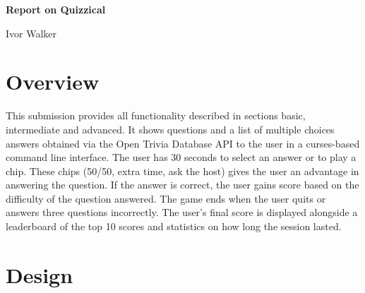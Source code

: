 \documentclass[12pt]{article}
\begin{document}
\begin{titlepage}
    \centering
    \vspace*{\fill}

    {\Huge \textbf{Report on Quizzical} \par}    
    \vspace{1cm}
    {\Large Ivor Walker\par}      
    \vspace{1cm}
    
    \vspace*{\fill}
\end{titlepage}


\section{Overview}

This submission provides all functionality described in sections basic, intermediate and advanced. It shows questions and a list of multiple choices answers obtained via the Open Trivia Database API to the user in a curses-based command line interface. The user has 30 seconds to select an answer or to play a chip. These chips (50/50, extra time, ask the host) gives the user an advantage in answering the question. If the answer is correct, the user gains score based on the difficulty of the question answered. The game ends when the user quits or answers three questions incorrectly. The user's final score is displayed alongside a leaderboard of the top 10 scores and statistics on how long the session lasted.

\section{Design}
% 
\end{document}
